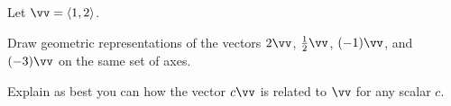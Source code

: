 \begin{activity} \label{A:9.2.6}

Let $\vv = \langle 1, 2 \rangle$.
    \ba
    \item Draw geometric representations of the vectors $2\vv$, $\frac{1}{2}\vv$, $(-1)\vv$, and $(-3)\vv$ on the same set of axes.

    \item Explain as best you can how the vector $c\vv$ is related to $\vv$ for any scalar $c$.

    \ea



\end{activity}
\begin{smallhint}

\end{smallhint}
\begin{bighint}

\end{bighint}
\begin{activitySolution}

\end{activitySolution}
\aftera
